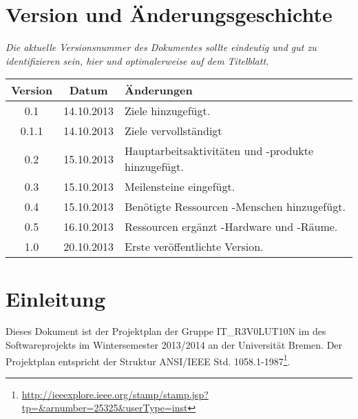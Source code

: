 \documentclass[fontsize=12pt,paper=a4,twoside]{scrartcl}
\begin{document}
\newpage

  \thispagestyle{fancy}
  \fancyhead{}
  \fancyfoot{}
  \renewcommand{\headrulewidth}{0.4pt}
  \tableofcontents

\newpage



\section*{Version und Änderungsgeschichte}

{\em Die aktuelle Versionsnummer des Dokumentes sollte eindeutig und gut zu
identifizieren sein, hier und optimalerweise auf dem Titelblatt.}

\begin{tabular}{ccl}
Version & Datum & Änderungen \\
\hline
0.1 & 14.10.2013 & Ziele hinzugefügt.\\
0.1.1 & 14.10.2013 & Ziele vervollständigt\\
0.2 & 15.10.2013 & Hauptarbeitsaktivitäten und -produkte hinzugefügt.\\
0.3 & 15.10.2013 & Meilensteine eingefügt.\\
0.4 & 15.10.2013 & Benötigte Ressourcen -Menschen hinzugefügt.\\
0.5 & 16.10.2013 & Ressourcen ergänzt -Hardware und -Räume.\\
1.0 & 20.10.2013 & Erste veröffentlichte Version. \\
\end{tabular}


\section{Einleitung}

Dieses Dokument ist der Projektplan der Gruppe IT\_R3V0LUT10N im des Softwareprojekts im Wintersemester 2013/2014 an der Universität Bremen. Der Projektplan entspricht der Struktur ANSI/IEEE Std. 1058.1-1987\footnote{\url{http://ieeexplore.ieee.org/stamp/stamp.jsp?tp=&arnumber=25325&userType=inst}}.
\end{document}

